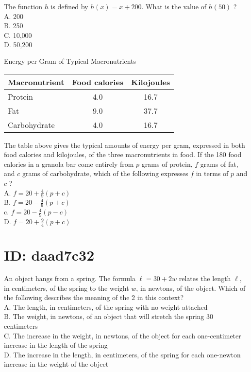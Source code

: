The function $h$ is defined by $h(x)=x+200$. What is the value of $h(50)$ ?\\
A. 200\\
B. 250\\
C. 10,000\\
D. 50,200

Energy per Gram of Typical Macronutrients

\begin{center}
\begin{tabular}{|l|c|c|}
\hline
Macronutrient & Food calories & Kilojoules \\
\hline
Protein & 4.0 & 16.7 \\
\hline
Fat & 9.0 & 37.7 \\
\hline
Carbohydrate & 4.0 & 16.7 \\
\hline
\end{tabular}
\end{center}

The table above gives the typical amounts of energy per gram, expressed in both food calories and kilojoules, of the three macronutrients in food. If the 180 food calories in a granola bar come entirely from $p$ grams of protein, $f$ grams of fat, and $c$ grams of carbohydrate, which of the following expresses $f$ in terms of $p$ and $c$ ?\\
A. $f=20+\frac{4}{9}(p+c)$\\
B. $f=20-\frac{4}{9}(p+c)$\\
c. $f=20-\frac{4}{9}(p-c)$\\
D. $f=20+\frac{9}{4}(p+c)$

\section*{ID: daad7c32}
An object hangs from a spring. The formula $\ell=30+2 w$ relates the length $\ell$, in centimeters, of the spring to the weight $w$, in newtons, of the object. Which of the following describes the meaning of the 2 in this context?\\
A. The length, in centimeters, of the spring with no weight attached\\
B. The weight, in newtons, of an object that will stretch the spring 30 centimeters\\
C. The increase in the weight, in newtons, of the object for each one-centimeter increase in the length of the spring\\
D. The increase in the length, in centimeters, of the spring for each one-newton increase in the weight of the object

